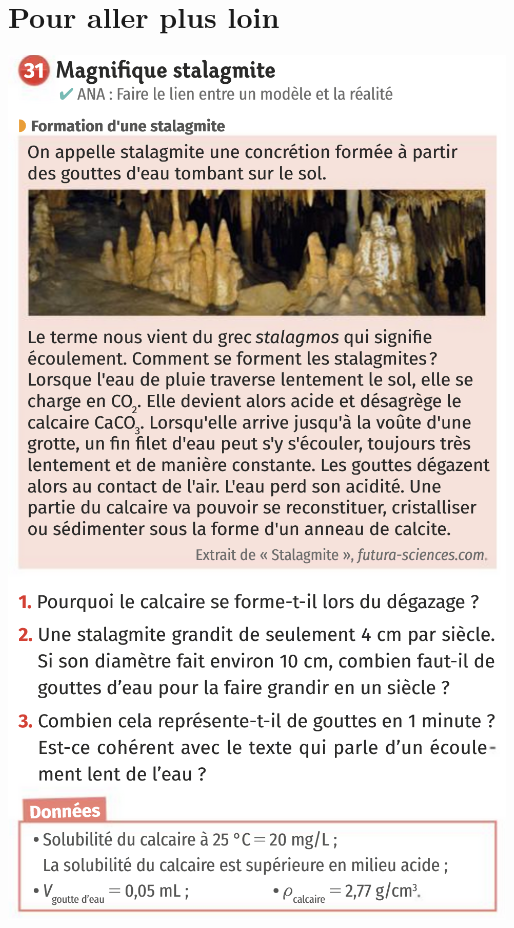 \section{Pour aller plus loin}
\begin{center}
\includegraphics[scale=1.5]{Images/Ex_31.png}
\end{center}
\newpage
